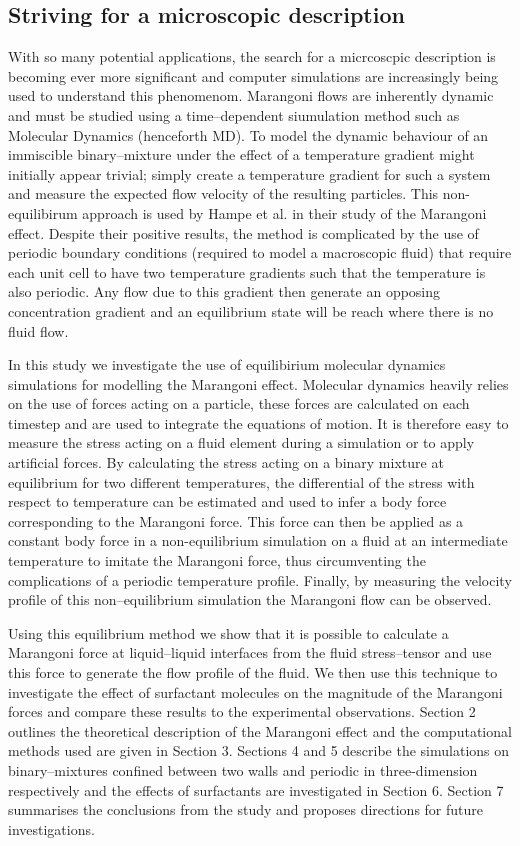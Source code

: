\subsection{Striving for a microscopic description}
With so many potential applications, the search for a micrcoscpic description is becoming ever more significant and computer simulations are increasingly being used to understand this phenomenom.
Marangoni flows are inherently dynamic and must be studied using a time--dependent siumulation method such as Molecular Dynamics (henceforth MD).
To model the dynamic behaviour of an immiscible binary--mixture under the effect of a temperature gradient might initially appear trivial; simply create a temperature gradient for such a system and measure the expected flow velocity of the resulting particles.
This non-equilibirum approach is used by Hampe et al. in their study of the Marangoni effect.\cite{HolgerBoppHampe}
Despite their positive results, the method is complicated by the use of periodic boundary conditions (required to model a macroscopic fluid) that require each unit cell to have two temperature gradients such that the temperature is also periodic.
Any flow due to this gradient then generate an opposing concentration gradient and an equilibrium state will be reach where there is no fluid flow.

In this study we investigate the use of equilibirium molecular dynamics simulations for modelling the Marangoni effect.
Molecular dynamics heavily relies on the use of forces acting on a particle, these forces are calculated on each timestep and are used to integrate the equations of motion.
It is therefore easy to measure the stress acting on a fluid element during a simulation or to apply artificial forces.
By calculating the stress acting on a binary mixture at equilibrium for two different temperatures, the differential of the stress with respect to temperature can be estimated and used to infer a body force corresponding to the Marangoni force.
This force can then be applied as a constant body force in a non-equilibrium simulation on a fluid at an intermediate temperature to imitate the Marangoni force, thus circumventing the complications of a periodic temperature profile.
Finally, by measuring the velocity profile of this non--equilibrium simulation the Marangoni flow can be observed.

Using this equilibrium method we show that it is possible to calculate a Marangoni force at liquid--liquid interfaces from the fluid stress--tensor and use this force to generate the flow profile of the fluid.
We then use this technique to investigate the effect of surfactant molecules on the magnitude of the Marangoni forces and compare these results to the experimental observations.
Section 2 outlines the theoretical description of the Marangoni effect and the computational methods used are given in Section 3.
Sections 4 and 5 describe the simulations on binary--mixtures confined between two walls and periodic in three-dimension respectively and the effects of surfactants are investigated in Section 6.
Section 7 summarises the conclusions from the study and proposes directions for future investigations.
